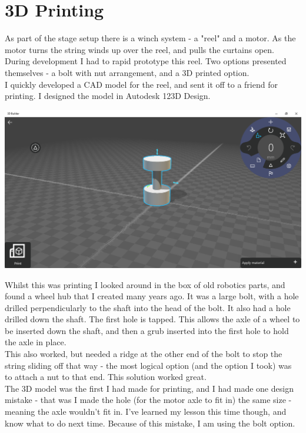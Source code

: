 		\chapter{3D Printing}
			As part of the stage setup there is a winch system - a "reel" and a motor. As the motor turns the string winds up over the reel, and pulls the curtains open.\\
			
			During development I had to rapid prototype this reel. Two options presented themselves - a bolt with nut arrangement, and a 3D printed option.\\
			
			I quickly developed a CAD model for the reel, and sent it off to a friend for printing. I designed the model in Autodesk 123D Design.\\
			
			\centerline{\includegraphics[width=0.75\linewidth]{images/3DPrinting}}
			
			Whilst this was printing I looked around in the box of old robotics parts, and found a wheel hub that I created many years ago. It was a large bolt, with a hole drilled perpendicularly to the shaft into the head of the bolt. It also had a hole drilled down the shaft. The first hole is tapped. This allows the axle of a wheel to be inserted down the shaft, and then a grub inserted into the first hole to hold the axle in place.\\
			
			This also worked, but needed a ridge at the other end of the bolt to stop the string sliding off that way - the most logical option (and the option I took) was to attach a nut to that end. This solution worked great.\\
			
			The 3D model was the first I had made for printing, and I had made one design mistake - that was I made the hole (for the motor axle to fit in) the same size - meaning the axle wouldn't fit in. I've learned my lesson this time though, and know what to do next time. Because of this mistake, I am using the bolt option.\\